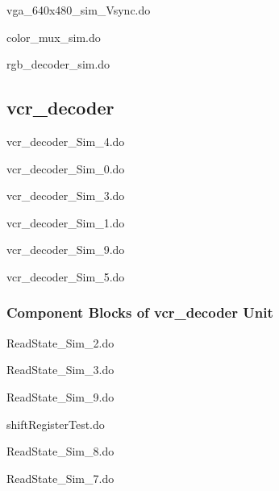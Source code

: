 \documentclass[a4paper]{article}
\begin{document}
vga\_640x480\_sim\_Vsync.do


color\_mux\_sim.do


rgb\_decoder\_sim.do


\clearpage

\subsection{vcr\_decoder}
vcr\_decoder\_Sim\_4.do


vcr\_decoder\_Sim\_0.do


vcr\_decoder\_Sim\_3.do


vcr\_decoder\_Sim\_1.do


vcr\_decoder\_Sim\_9.do


vcr\_decoder\_Sim\_5.do


\subsubsection{Component Blocks of vcr\_decoder Unit}
ReadState\_Sim\_2.do


ReadState\_Sim\_3.do


ReadState\_Sim\_9.do


shiftRegisterTest.do


ReadState\_Sim\_8.do


ReadState\_Sim\_7.do

\end{document}
